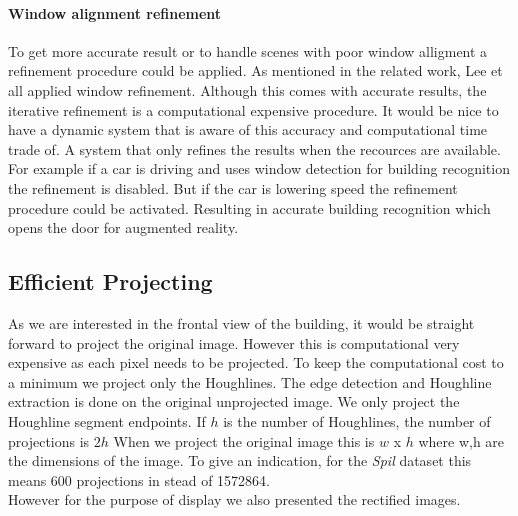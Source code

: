 \paragraph{Window alignment refinement}
To get more accurate result or to handle scenes with poor window alligment a refinement procedure could be applied.
As mentioned in the related work, Lee et all \cite{Lee_extraction} applied window refinement.
Although this comes with accurate results, the iterative refinement is a
computational expensive procedure. 
It would be nice to have a dynamic system that is aware of this 
accuracy and computational time trade of. A system that only refines the results when the recources are available.
For example if a car is driving and uses window detection for building recognition the refinement is disabled.
But if the car is lowering speed the refinement procedure could be activated.
Resulting in accurate building recognition which opens the door for augmented reality.








\subsection{Efficient Projecting} 
As we are interested in the frontal view of the building, it would be straight
forward to project the original image. However this is computational
very expensive as each pixel needs to be projected. To keep the computational cost to a minimum we project only the
Houghlines. The edge detection and Houghline extraction is done on the original
unprojected image. We only project the Houghline segment
endpoints. If $h$ is the number of Houghlines, the number of projections is $2h$
When we project the original image this is $w$ x $h$ where w,h are the dimensions of
the image. To give an indication, for the \emph{Spil} dataset %
this means 600 projections in stead of 1572864.\\
However for the purpose of display we also presented the rectified images.




% 
% 
% 
% 
% 
% 
% 
% 
